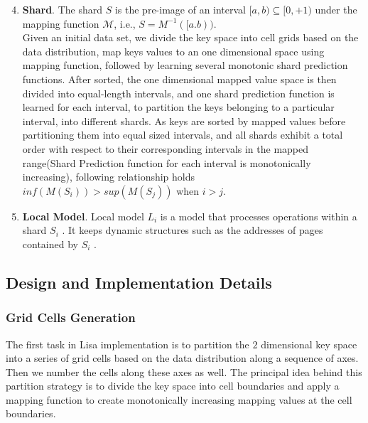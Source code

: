 \begin{enumerate}
\setcounter{enumi}{3}
	\item \textbf{Shard}. The shard $S$ is the pre-image of an
interval $[a, b) \subseteq [0, +1)$ under the mapping function $\mathcal{M}$,  i.e., $S = M^{-1}([a.b))$. \\
Given an initial data set, we divide the key space into cell grids based on the data distribution, map keys values to an one dimensional space using mapping function, followed by learning several monotonic shard prediction functions. After sorted, the one dimensional mapped value space is then divided into equal-length intervals, and one shard prediction function is learned for each interval, to partition the keys belonging to a particular interval, into different shards. As keys are sorted by mapped values before partitioning them into equal sized intervals, and all shards exhibit a total order with respect to their corresponding intervals in the mapped range(Shard Prediction function for each interval is monotonically increasing), following relationship holds \\
$ inf (M(S_{i}))  > sup (M(S_{j}))$ when $i > j$.

\item \textbf{Local Model}. Local model $L_{i}$ is a model
that processes operations within a shard $S_i$ . It keeps dynamic
structures such as the addresses of pages contained by $S_{i}$ .
\end{enumerate}

\subsection{Design and Implementation Details}
\subsubsection{Grid Cells Generation} 
The first task in Lisa implementation is to partition the $2$ dimensional key space into a series of grid cells based on the data distribution along a sequence of axes. Then we number the cells along these axes as well. The principal idea behind this partition strategy is to divide the key space into cell boundaries and apply a mapping function to create monotonically increasing mapping values at the cell boundaries. 


